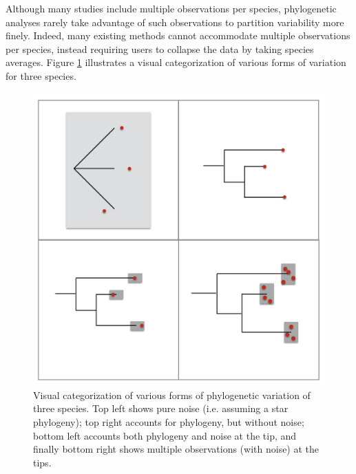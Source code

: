 \documentclass[12pt]{article}
\begin{document}
Although many studies include multiple observations per species, phylogenetic analyses rarely take advantage of such observations to partition variability more finely.
Indeed, many existing methods cannot accommodate multiple observations per species, instead requiring users to collapse the data by taking species averages.
Figure \ref{fig:variation} illustrates a visual categorization of various forms of variation for three species. 

\begin{center}
\begin{figure}[H]
  \includegraphics[scale=0.8]{./phylo_diagram.png}
  \caption{Visual categorization of various forms of phylogenetic variation of three species. Top left shows pure noise (i.e. assuming a star phylogeny); top right accounts for phylogeny, but without noise; bottom left accounts both phylogeny and noise at the tip, and finally bottom right shows multiple observations (with noise) at the tips.}
\label{fig:variation}
\end{figure}
\end{center}
\end{document}
